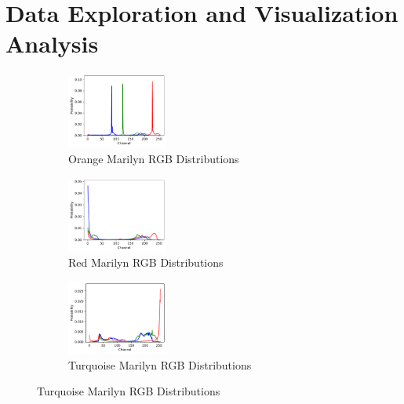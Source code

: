 \documentclass{article}
\begin{document}
\hypertarget{data-exploration-and-visualization-analysis}{%
\section{Data Exploration and Visualization
Analysis}\label{data-exploration-and-visualization-analysis}}

\begin{figure}[ht]
  \centering
  \begin{subfigure}{0.3\textwidth}
    \centering
    \includegraphics[width=125px]{main_files/figure-latex/2_1_orange_marilyn_dist.pdf}
    \caption{Orange Marilyn RGB Distributions}
    \label{fig:2_1_orange_marilyn_dist}
  \end{subfigure}
  \hfill
  \begin{subfigure}{0.3\textwidth}
    \centering
    \includegraphics[width=125px]{main_files/figure-latex/2_2_red_marilyn_dist.pdf}
    \caption{Red Marilyn RGB Distributions}
    \label{fig:2_2_red_marilyn_dist}
  \end{subfigure}
  \hfill
  \begin{subfigure}{0.3\textwidth}
    \centering
    \includegraphics[width=125px]{main_files/figure-latex/2_3_turq_marilyn_dist.pdf}
    \caption{Turquoise Marilyn RGB Distributions}
    \label{fig:2_3_turq_marilyn_dist}
  \end{subfigure}

  \vspace{1em}


\end{figure}
\end{document}
